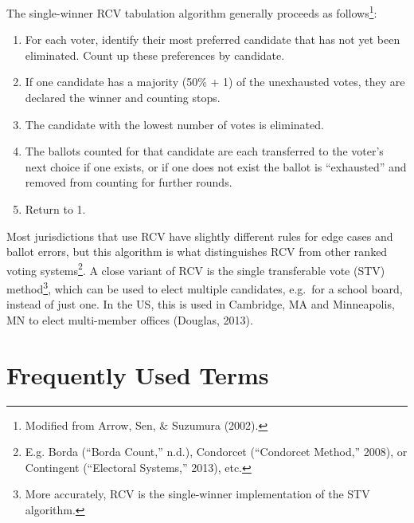 \documentclass[12pt,twoside]{reedthesis}
\begin{document}
The single-winner RCV tabulation algorithm generally proceeds as follows\footnote{Modified from Arrow, Sen, \& Suzumura (2002).}:
\begin{enumerate}
\def\labelenumi{\arabic{enumi}.}
\item
  For each voter, identify their most preferred candidate that has not yet been eliminated. Count up these preferences by candidate.
\item
  If one candidate has a majority (50\% + 1) of the unexhausted votes, they are declared the winner and counting stops.
\item
  The candidate with the lowest number of votes is eliminated.
\item
  The ballots counted for that candidate are each transferred to the voter's next choice if one exists, or if one does not exist the ballot is ``exhausted'' and removed from counting for further rounds.
\item
  Return to 1.
\end{enumerate}
Most jurisdictions that use RCV have slightly different rules for edge cases and ballot errors, but this algorithm is what distinguishes RCV from other ranked voting systems\footnote{E.g. Borda (``Borda Count,'' n.d.), Condorcet (``Condorcet Method,'' 2008), or Contingent (``Electoral Systems,'' 2013), etc.}. A close variant of RCV is the single transferable vote (STV) method\footnote{More accurately, RCV is the single-winner implementation of the STV algorithm.}, which can be used to elect multiple candidates, e.g.~for a school board, instead of just one. In the US, this is used in Cambridge, MA and Minneapolis, MN to elect multi-member offices (Douglas, 2013).

\hypertarget{frequently-used-terms}{%
\section{Frequently Used Terms}\label{frequently-used-terms}}
\end{document}

